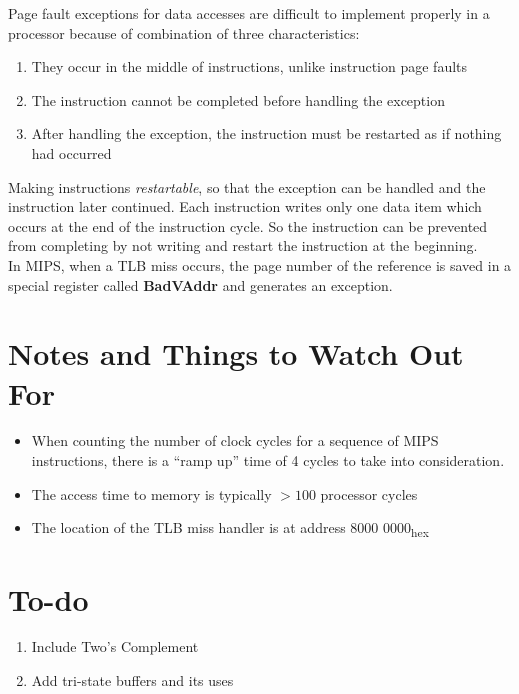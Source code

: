 \documentclass[12pt]{article}
\theoremstyle{definition}
\begin{document}
  Page fault exceptions for data accesses are difficult to implement properly in a processor because of combination of three characteristics:
  \begin{enumerate}
    \item They occur in the middle of instructions, unlike instruction page faults
    \item The instruction cannot be completed before handling the exception
    \item After handling the exception, the instruction must be restarted as if nothing had occurred
  \end{enumerate}
  Making instructions \emph{restartable}, so that the exception can be handled and the instruction later continued.
  Each instruction writes only one data item which occurs at the end of the instruction cycle.
  So the instruction can be prevented from completing by not writing and restart the instruction at the beginning. \\

  In MIPS, when a TLB miss occurs, the page number of the reference is saved in a special register called \textbf{BadVAddr} and generates an exception.















  \newpage
  \section{Notes and Things to Watch Out For}
  \begin{itemize}
    \item When counting the number of clock cycles for a sequence of MIPS instructions, there is a ``ramp up'' time of 4 cycles to take into consideration.
    \item The access time to memory is typically $> 100$ processor cycles
    \item The location of the TLB miss handler is at address 8000 0000\textsubscript{hex}
  \end{itemize}

  \newpage
  \section{To-do}
  \begin{enumerate}
    \item Include Two's Complement
    \item Add tri-state buffers and its uses
  \end{enumerate}
\end{document}
